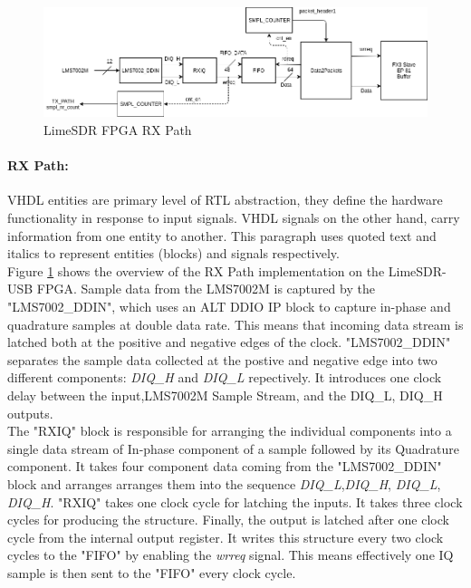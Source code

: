 \begin{figure}[h!]
\centering
\includegraphics[width=\textwidth]{Figure/DATA2PACKETS.png}
\caption{LimeSDR FPGA RX Path}
\label{RX_Path}
\end{figure}

\paragraph{RX Path:}
\ac{VHDL} entities are primary level of \ac{RTL} abstraction, they define the hardware functionality in response to input signals.
\ac{VHDL} signals on the other hand, carry information from one entity to another.
This paragraph uses quoted text and italics to represent entities (blocks) and signals respectively.\\

Figure \ref{RX_Path} shows the overview of the RX Path implementation on the LimeSDR-USB \ac{FPGA}.
Sample data from the LMS7002M is captured by the "LMS7002\_DDIN", which uses an ALT DDIO IP block to capture in-phase and quadrature samples at double data rate.
This means that incoming data stream is latched both at the positive and negative edges of the clock.
"LMS7002\_DDIN" separates the sample data collected at the postive and negative edge into two different components: \textit{DIQ\_H} and \textit{DIQ\_L} repectively.
It introduces one clock delay between the input,LMS7002M Sample Stream, and the DIQ\_L, DIQ\_H outputs.\\

The "RXIQ" block is responsible for arranging the individual components into a single data stream of In-phase component of a sample followed by its Quadrature component.
It takes four component data coming from the "LMS7002\_DDIN" block and arranges arranges them into the sequence \textit{DIQ\_L},\textit{DIQ\_H}, \textit{DIQ\_L}, \textit{DIQ\_H}.
"RXIQ" takes one clock cycle for latching the inputs.
It takes three clock cycles for producing the structure.
Finally, the output is latched after one clock cycle from the internal output register.
It writes this structure every two clock cycles to the "FIFO" by enabling the \textit{wrreq} signal.
This means effectively one IQ sample is then sent to the "FIFO" every clock cycle. \\

